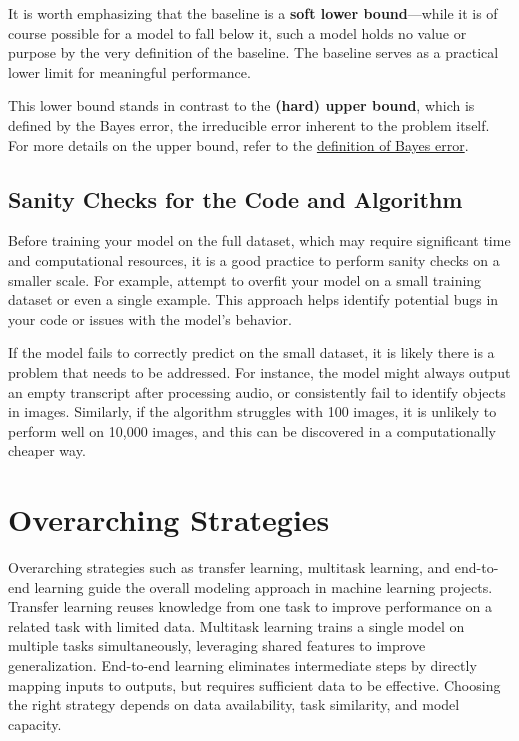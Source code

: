 \documentclass[12pt,openany]{book}
\begin{document}
It is worth emphasizing that the baseline is a \textbf{soft lower bound}---while it 
is of course possible for a model to fall below it, such a model holds no value or purpose by the very definition of the baseline. The baseline serves as a practical lower limit for meaningful performance.  \newline

This lower bound stands in contrast to the \textbf{(hard) upper bound}, which is defined 
by the Bayes error, the irreducible error inherent to the problem itself. For more 
details on the upper bound, refer to the \hyperlink{bayes-error}{definition of Bayes error}. \newline



\section{Sanity Checks for the Code and Algorithm}

Before training your model on the full dataset, which may require significant time and computational resources, it is a good practice to perform sanity checks on a smaller scale. For example, attempt to overfit your model on a small training dataset or even a single example. This approach helps identify potential bugs in your code or issues with the model's behavior. \newline

If the model fails to correctly predict on the small dataset, it is likely there is a problem that needs to be addressed. For instance, the model might always output an empty transcript after processing audio, or consistently fail to identify objects in images. Similarly, if the algorithm struggles with 100 images, it is unlikely to perform well on 10,000 images, and this can be discovered in a computationally cheaper way.




\chapter{Overarching Strategies}

\begin{examplebox} Overarching strategies such as transfer learning, multitask learning, and end-to-end learning guide the overall modeling approach in machine learning projects. Transfer learning reuses knowledge from one task to improve performance on a related task with limited data. Multitask learning trains a single model on multiple tasks simultaneously, leveraging shared features to improve generalization. End-to-end learning eliminates intermediate steps by directly mapping inputs to outputs, but requires sufficient data to be effective. Choosing the right strategy depends on data availability, task similarity, and model capacity. 
\end{examplebox}
\end{document}
